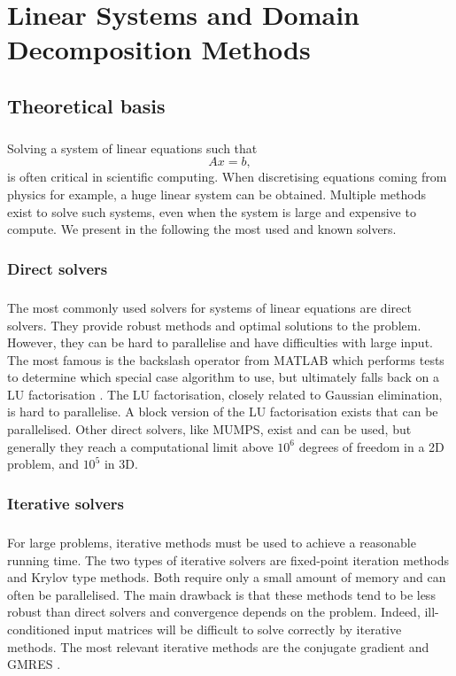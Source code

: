 \chapter{Linear Systems and Domain Decomposition Methods}



\section{Theoretical basis}

\paragraph{}
Solving a system of linear equations such that
\[Ax = b,\]
is often critical in scientific computing.
When discretising equations coming from physics for example, a huge linear system can be obtained.
Multiple methods exist to solve such systems, even when the system is large and expensive to compute.
We present in the following the most used and known solvers.

\subsection{Direct solvers}

\paragraph{}
The most commonly used solvers for systems of linear equations are direct solvers.
They provide robust methods and optimal solutions to the problem.
However, they can be hard to parallelise and have difficulties with large input.
The most famous is the backslash operator from MATLAB which performs tests to determine which special case algorithm to use, but ultimately falls back on a LU factorisation \cite{mldivide_matlab}.
The LU factorisation, closely related to Gaussian elimination, is hard to parallelise.
A block version of the LU factorisation exists that can be parallelised.
Other direct solvers, like MUMPS, exist and can be used, but generally they reach a computational limit above \(10^6\) degrees of freedom in a 2D problem, and \(10^5\) in 3D.

\subsection{Iterative solvers}

\paragraph{}
For large problems, iterative methods must be used to achieve a reasonable running time.
The two types of iterative solvers are fixed-point iteration methods and Krylov type methods.
Both require only a small amount of memory and can often be parallelised.
The main drawback is that these methods tend to be less robust than direct solvers and convergence depends on the problem.
Indeed, ill-conditioned input matrices will be difficult to solve correctly by iterative methods.
The most relevant iterative methods are the conjugate gradient and GMRES \cite{saad_gmres_1986}.

